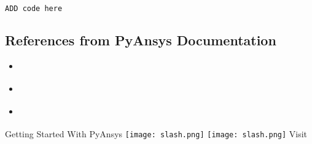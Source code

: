 \documentclass[9pt,landscape]{article}
\begin{document}
\begin{multicols}{3}
\begin{lstlisting}[language=Python]
ADD code here

\end{lstlisting}


\subsection{References from PyAnsys Documentation}
\begin{itemize}
\item \href{usefullinks}{\color{blue}{name of link}}
\item \href{useful_links}{\color{blue}{name of link}}
\item \href{useful_links}{\color{blue}{name of link}}
\end{itemize}
\end{multicols}

\vspace{-0.15cm}
\noindent\makebox[\linewidth]{\rule{\paperwidth}{4pt}}
\begin{center}
Getting Started With PyAnsys \texttt{[image: slash.png]} \href{https://github.com/pyansys}{\color{blue}{PyAnsys on GitHub}} \texttt{[image: slash.png]} Visit 
\end{center}
\end{document}
